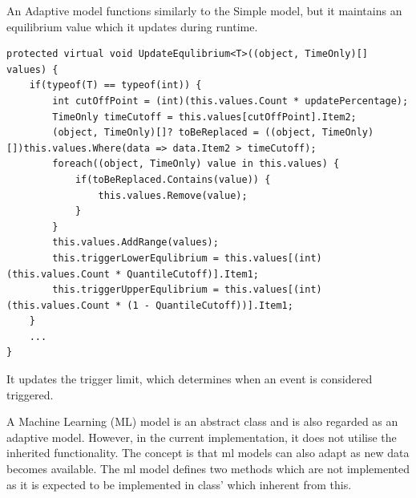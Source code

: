 	An Adaptive model functions similarly to the Simple model, but it maintains an equilibrium value which it updates during runtime.
	\begin{lstlisting}[language={[sharp]C},caption={AdaptivModel.cs},label=lst:updateEqualibrium]
protected virtual void UpdateEqulibrium<T>((object, TimeOnly)[] values) {
	if(typeof(T) == typeof(int)) {
		int cutOffPoint = (int)(this.values.Count * updatePercentage);
		TimeOnly timeCutoff = this.values[cutOffPoint].Item2;
		(object, TimeOnly)[]? toBeReplaced = ((object, TimeOnly)[])this.values.Where(data => data.Item2 > timeCutoff);
		foreach((object, TimeOnly) value in this.values) {
			if(toBeReplaced.Contains(value)) {
				this.values.Remove(value);
			}
		}
		this.values.AddRange(values);
		this.triggerLowerEqulibrium = this.values[(int)(this.values.Count * QuantileCutoff)].Item1;
		this.triggerUpperEqulibrium = this.values[(int)(this.values.Count * (1 - QuantileCutoff))].Item1;
	}
	...
}
	\end{lstlisting}
	It updates the trigger limit, which determines when an event is considered triggered.
	
	A Machine Learning (ML) model is an abstract class and is also regarded as an adaptive model. However, in the current implementation, it does not utilise the inherited functionality. The concept is that \gls{ml} models can also adapt as new data becomes available. The \gls{ml} model defines two methods which are not implemented as it is expected to be implemented in class' which inherent from this.
	
